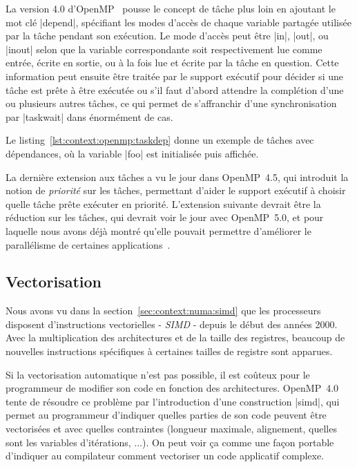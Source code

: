 La version 4.0 d'OpenMP~\cite{openmp40} pousse le concept de tâche plus loin en ajoutant le mot clé |depend|, spécifiant les modes d'accès de chaque variable partagée utilisée par la tâche pendant son exécution.
Le mode d'accès peut être |in|, |out|, ou |inout| selon que la variable correspondante soit respectivement lue comme entrée, écrite en sortie, ou à la fois lue et écrite par la tâche en question.
Cette information peut ensuite être traitée par le support exécutif pour décider si une tâche est prête à être exécutée ou s'il faut d'abord attendre la complétion d'une ou plusieurs autres tâches, ce qui permet de s'affranchir d'une synchronisation par |taskwait| dans énormément de cas.

Le listing~\ref{lst:context:openmp:taskdep} donne un exemple de tâches avec dépendances, où la variable |foo| est initialisée puis affichée.


La dernière extension aux tâches a vu le jour dans OpenMP~4.5, qui introduit la notion de \emph{priorité} sur les tâches, permettant d'aider le support exécutif à choisir quelle tâche prête exécuter en priorité.
L'extension suivante devrait être la réduction sur les tâches, qui devrait voir le jour avec OpenMP~5.0, et pour laquelle nous avons déjà montré qu'elle pouvait permettre d'améliorer le parallélisme de certaines applications~\cite{Virouleau2014}.

\subsection{Vectorisation}

Nous avons vu dans la section~\ref{sec:context:numa:simd} que les processeurs disposent d'instructions vectorielles - \emph{SIMD} - depuis le début des années 2000.
Avec la multiplication des architectures et de la taille des registres, beaucoup de nouvelles instructions spécifiques à certaines tailles de registre sont apparues.

Si la vectorisation automatique n'est pas possible, il est coûteux pour le programmeur de modifier son code en fonction des architectures.
OpenMP~4.0 tente de résoudre ce problème par l'introduction d'une construction |simd|, qui permet au programmeur d'indiquer quelles parties de son code peuvent être vectorisées et avec quelles contraintes (longueur maximale, alignement, quelles sont les variables d'itérations, ...).
On peut voir ça comme une façon portable d'indiquer au compilateur comment vectoriser un code applicatif complexe.

